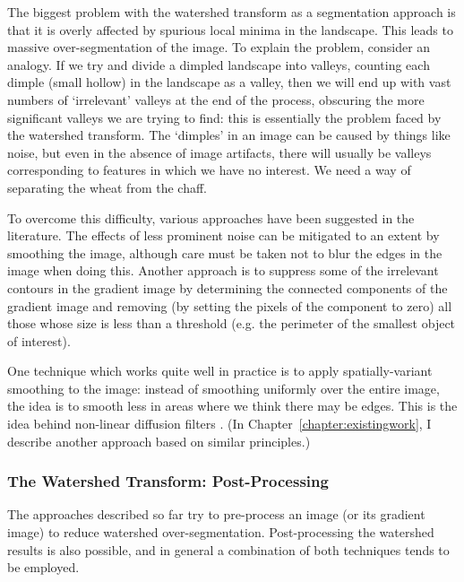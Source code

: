 
The biggest problem with the watershed transform as a segmentation approach is that it is overly affected by spurious local minima in the landscape. This leads to massive over-segmentation of the image. To explain the problem, consider an analogy. If we try and divide a dimpled landscape into valleys, counting each dimple (small hollow) in the landscape as a valley, then we will end up with vast numbers of `irrelevant' valleys at the end of the process, obscuring the more significant valleys we are trying to find: this is essentially the problem faced by the watershed transform. The `dimples' in an image can be caused by things like noise, but even in the absence of image artifacts, there will usually be valleys corresponding to features in which we have no interest. We need a way of separating the wheat from the chaff.

To overcome this difficulty, various approaches have been suggested in the literature. The effects of less prominent noise can be mitigated to an extent by smoothing the image, although care must be taken not to blur the edges in the image when doing this. Another approach \cite{ancin95} is to suppress some of the irrelevant contours in the gradient image by determining the connected components of the gradient image and removing (by setting the pixels of the component to zero) all those whose size is less than a threshold (e.g. the perimeter of the smallest object of interest).

One technique which works quite well in practice is to apply spatially-variant smoothing to the image: instead of smoothing uniformly over the entire image, the idea is to smooth less in areas where we think there may be edges. This is the idea behind non-linear diffusion filters \cite{perona90}. (In Chapter~\ref{chapter:existingwork}, I describe another approach based on similar principles.)

\subsubsection*{The Watershed Transform: Post-Processing}


The approaches described so far try to pre-process an image (or its gradient image) to reduce watershed over-segmentation. Post-processing the watershed results is also possible, and in general a combination of both techniques tends to be employed.

